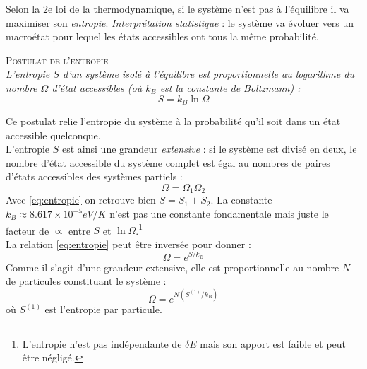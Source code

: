 \documentclass	[11pt, a4paper, openany]{book}
\begin{document}
		Selon la 2e loi de la thermodynamique, si le système n'est pas à l'équilibre il va  
		maximiser son \textit{entropie}. \textit{Interprétation statistique} : le système va évoluer vers
		un macroétat pour lequel les états accessibles ont tous la même probabilité.
		\begin{center}
			\textsc{Postulat de l'entropie}\\
			\textit{L'entropie $S$ d'un système isolé à l'équilibre est proportionnelle au logarithme du nombre
				$\Omega$ d'état accessibles (où $k_B$ est la constante de Boltzmann) :}
			\begin{equation}
				S = k_B\ln\Omega
				\label{eq:entropie}
			\end{equation}
		\end{center}
		Ce postulat relie l'entropie du système à la probabilité qu'il soit dans un état accessible 
		quelconque.\\
		L'entropie $S$ est ainsi une grandeur \textit{extensive} : si le système est divisé en deux, le 
		nombre d'état accessible du système complet est égal au nombres de paires d'états accessibles des
		systèmes partiels :
		\begin{equation}
			\Omega = \Omega_1\Omega_2
		\end{equation}
		Avec \autoref{eq:entropie} on retrouve bien $S = S_1+S_2$. La constante $k_B \approx 8.617\times
		10^{-5} eV/K$ n'est pas une constante fondamentale mais juste le facteur de $\propto$ entre $S$
		et $\ln\Omega$.\footnote{L'entropie n'est pas indépendante de $\delta E$ mais son apport est 
			faible et peut être négligé.}\\
		
		La relation \autoref{eq:entropie} peut être inversée pour donner :
		\begin{equation}
			\Omega = e^{S/k_B}
		\end{equation}
		Comme il s'agit d'une grandeur extensive, elle est proportionnelle au nombre $N$ de particules 
		constituant le système :
		\begin{equation}
			\Omega = e^{N(S^{(1)}/k_B)}
		\end{equation}
		où $S^{(1)}$ est l'entropie par particule.
		
		
\end{document}
